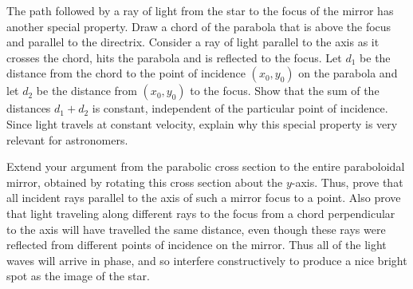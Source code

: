 \documentclass
[justified,nohyper]
{tufte-handout}
\theoremstyle{mydef}
\begin{document}
The path followed by a ray of light from the star to the focus of the mirror has another special property. Draw a chord of the parabola that is above the focus and parallel to the directrix. Consider a ray of light parallel to the axis as it crosses the chord, hits the parabola and is reflected to the focus. Let $d_1$ be the distance from the chord to the point of incidence $(x_0,y_0)$ on the parabola and let $d_2$ be the distance from $(x_0,y_0)$ to the focus. Show that the sum of the distances $d_1+d_2$ is constant, independent of the particular point of incidence. Since light travels at constant velocity, explain why this special property is very relevant for astronomers.

Extend your argument from the parabolic cross section to the entire paraboloidal mirror, obtained by rotating this cross section about the $y$-axis. Thus, prove that all incident rays parallel to the axis of such a mirror focus to a point. Also prove that light traveling along different rays to the focus from a chord perpendicular to the axis will have travelled the same distance, even though these rays were reflected from different points of incidence on the mirror. Thus all of the light waves will arrive in phase, and so interfere constructively to produce a nice bright spot as the image of the star.
\end{document}
